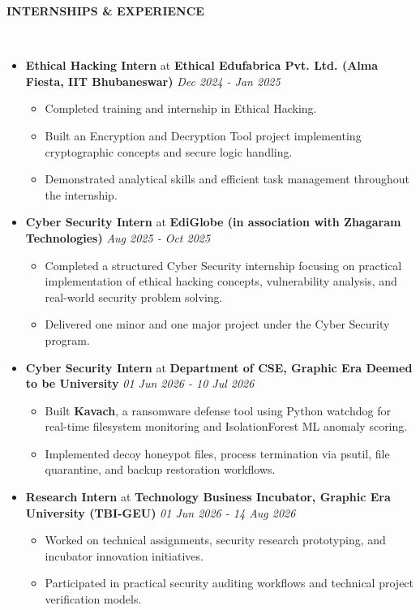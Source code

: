 \documentclass[a4paper,10pt]{article}
\newcommand{\isep}{-2 pt}
\newcommand{\lsep}{-0.5cm}
\newcommand{\resheading}[1]{{\small \colorbox{mygrey}{\begin{minipage}{6.62in}{\textbf{#1 \vphantom{p\^{E}}}}\end{minipage}}}}
\begin{document}
\resheading{\textbf{INTERNSHIPS \& EXPERIENCE} }\\[\lsep]
\begin{itemize}
\item \textbf{Ethical Hacking Intern} at \textbf{Ethical Edufabrica Pvt. Ltd. (Alma Fiesta, IIT Bhubaneswar)} \hfill \textit{Dec 2024 - Jan 2025} \\[-0.6cm]
	\begin{itemize}\itemsep \isep
	\item Completed training and internship in Ethical Hacking.
	\item Built an Encryption and Decryption Tool project implementing cryptographic concepts and secure logic handling.
	\item Demonstrated analytical skills and efficient task management throughout the internship.
	\end{itemize}

\item \textbf{Cyber Security Intern} at \textbf{EdiGlobe (in association with Zhagaram Technologies)} \hfill \textit{Aug 2025 - Oct 2025} \\[-0.6cm]
	\begin{itemize}\itemsep \isep
	\item Completed a structured Cyber Security internship focusing on practical implementation of ethical hacking concepts, vulnerability analysis, and real-world security problem solving.
	\item Delivered one minor and one major project under the Cyber Security program.
	\end{itemize}

\item \textbf{Cyber Security Intern} at \textbf{Department of CSE, Graphic Era Deemed to be University} \hfill \textit{01 Jun 2026 - 10 Jul 2026} \\[-0.6cm]
	\begin{itemize}\itemsep \isep
	\item Built \textbf{Kavach}, a ransomware defense tool using Python watchdog for real-time filesystem monitoring and IsolationForest ML anomaly scoring.
	\item Implemented decoy honeypot files, process termination via psutil, file quarantine, and backup restoration workflows.
	\end{itemize}

\item \textbf{Research Intern} at \textbf{Technology Business Incubator, Graphic Era University (TBI-GEU)} \hfill \textit{01 Jun 2026 - 14 Aug 2026} \\[-0.6cm]
	\begin{itemize}\itemsep \isep
	\item Worked on technical assignments, security research prototyping, and incubator innovation initiatives.
	\item Participated in practical security auditing workflows and technical project verification models.
	\end{itemize}
\end{itemize}
\end{document}
